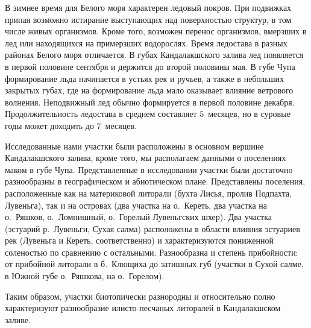 В зимнее время для Белого моря характерен ледовый покров. 
При подвижках припая возможно истирание выступающих над поверхностью структур, в том числе живых организмов. 
Кроме того, возможен перенос организмов, вмерзших в лед или находящихся на примерзших водорослях.
 Время ледостава в разных районах Белого моря отличается. 
В губах Кандалакшского залива лед появляется в первой половине сентября и держится до второй половины мая. 
В губе Чупа формирование льда начинается в устьях рек и ручьев, а также в небольших закрытых губах, где на формирование льда мало оказывает влияние ветрового волнения. 
Неподвижный лед обычно формируется в первой половине декабря. 
Продолжительность ледостава в среднем составляет $5$~месяцев, но в суровые годы может доходить до $7$~месяцев. 

Исследованные нами участки были расположены в основном вершине Кандалакшского залива, кроме того, мы располагаем данными о поселениях маком в губе Чупа. 
Представленные в исследовании участки были достаточно разнообразны в географическом и абиотическом плане.
Представлены поселения, расположенные как на материковой литорали (бухта Лисья, пролив Подпахта, Лувеньга), так и на островах (два участка на о.~Кереть, два участка на о.~Ряшков, о.~Ломнишный, о.~Горелый Лувеньгских шхер). 
Два участка (эстуарий р.~Лувеньги, Сухая салма) расположены в области влияния эстуариев рек (Лувеньга и Кереть, соответственно)  и характеризуются пониженной соленостью по сравнению с остальными.
Разнообразна и степень прибойности: от прибойной литорали в б.~Клющиха до затишных губ (участки в Сухой салме, в Южной губе о.~Ряшкова, на о.~Горелом).

Таким образом, участки биотопически разнородны и относительно полно характеризуют разнообразие илисто-песчаных литоралей в Кандалакшском заливе.

